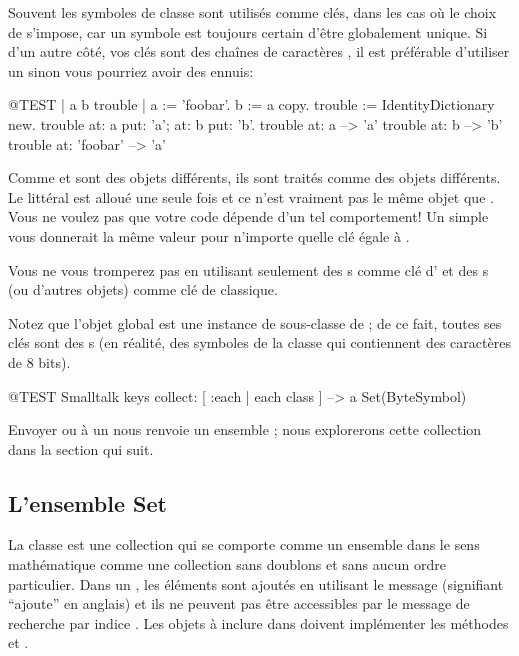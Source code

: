 \documentclass[a4paper,10pt,twoside]{book}
\begin{document}
Souvent les symboles de classe  sont utilisés comme clés, dans les cas où le choix de  s'impose, car un symbole est toujours certain d'être globalement unique. Si d'un autre côté, vos clés sont des chaînes de caractères , il est préférable d'utiliser un  sinon vous pourriez avoir des ennuis:

\begin{code}{@TEST | a b trouble |}
a := 'foobar'.
b := a copy.
trouble := IdentityDictionary new.
trouble at: a put: 'a'; at: b put: 'b'.
trouble at: a          --> 'a'
trouble at: b          --> 'b'
trouble at: 'foobar' --> 'a'
\end{code}

\noindent
Comme  et  sont des objets différents, ils sont traités comme des objets différents.
Le littéral \mbox{} est alloué une seule fois et
ce n'est vraiment pas le même objet que .
Vous ne voulez pas que votre code dépende d'un tel comportement!
Un simple  vous donnerait la même valeur pour n'importe quelle clé égale à .

Vous ne vous tromperez pas en utilisant seulement des s comme clé d' et des s (ou d'autres objets) comme clé de  classique.

Notez que l'objet global  est une instance de  sous-classe de  ; de ce fait, toutes ses clés sont des s (en réalité, des symboles de la classe  qui contiennent des caractères de 8 bits).

\begin{code}{@TEST}
Smalltalk keys collect: [ :each | each class ] --> a Set(ByteSymbol)
\end{code}
\noindent
Envoyer  ou  à un  nous renvoie 
un ensemble ; nous explorerons cette collection dans la section qui suit.

\subsection{L'ensemble Set}
La classe  est une collection qui se comporte comme un ensemble
dans le sens mathématique \ie comme une collection sans doublons
et sans aucun ordre particulier. Dans un , les éléments sont
ajoutés en utilisant le message  (signifiant
``ajoute'' en anglais) et ils ne peuvent pas être accessibles par le message de recherche par indice . 
Les objets à inclure dans  doivent implémenter les méthodes  et \ct{=}.
\end{document}
